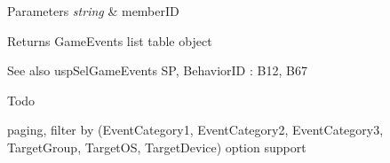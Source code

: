 \begin{DoxyParams}{Parameters}
{\em string} & member\+ID \\
\hline
\end{DoxyParams}
\begin{DoxyReturn}{Returns}
Game\+Events list table object 
\end{DoxyReturn}
\begin{DoxySeeAlso}{See also}
usp\+Sel\+Game\+Events SP, Behavior\+ID \+: B12, B67 
\end{DoxySeeAlso}
\begin{DoxyRefDesc}{Todo}
\item[\hyperlink{a00001__todo000011}{Todo}]paging, filter by (Event\+Category1, Event\+Category2, Event\+Category3, Target\+Group, Target\+OS, Target\+Device) option support \end{DoxyRefDesc}
